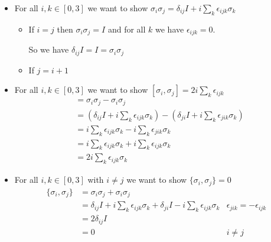 \begin{itemize}
  \item For all $i, k \in [0, 3]$ we want to show
    $\sigma_i \sigma_j = \delta_{ij} I + i \sum_k \epsilon_{ijk} \sigma_k$

    \begin{itemize}
      \item If $i=j$ then $\sigma_i \sigma_j = I$ and for all $k$ we have
        $\epsilon_{ijk} = 0$.

        So we have $\delta_{ij} I = I = \sigma_i \sigma_j$
      \item If $j = i + 1$
    \end{itemize}

  \item For all $i, k \in [0, 3]$ we want to show $[\sigma_i, \sigma_j] = 
    2i \sum_k \epsilon_{ijk}$
    \begin{align*}
      [\sigma_i, \sigma_j] &= \sigma_i \sigma_j - \sigma_i \sigma_j \\
      &= (\delta_{ij} I + i \sum_k \epsilon_{ijk} \sigma_k) -
         (\delta_{ji} I + i \sum_k \epsilon_{jik} \sigma_k) \\
      &= i \sum_k \epsilon_{ijk} \sigma_k - i \sum_k \epsilon_{jik} \sigma_k \\
      &= i \sum_k \epsilon_{ijk} \sigma_k + i \sum_k \epsilon_{ijk} \sigma_k \\
      &= 2i \sum_k \epsilon_{ijk} \sigma_k
    \end{align*}
  \item For all $i, k \in [0, 3]$ with $i\not = j$ we want to show $\{\sigma_i, \sigma_j\} = 0$
    \begin{align*}
      \{\sigma_i, \sigma_j\} &= \sigma_i \sigma_j + \sigma_i \sigma_j \\
      &= \delta_{ij} I + i \sum_k \epsilon_{ijk} \sigma_k +
         \delta_{ji} I - i \sum_k \epsilon_{ijk} \sigma_k & \epsilon_{jik} =
         -\epsilon_{ijk}\\
      &= 2 \delta_{ij} I \\
      &= 0 & i \not = j
    \end{align*}
\end{itemize}


